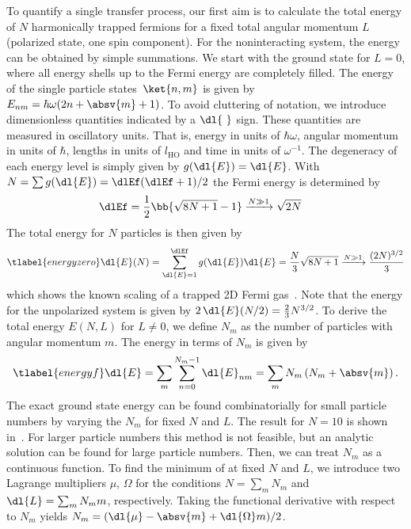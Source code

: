 To quantify a single transfer process, our first aim is to calculate the total energy of $N$ harmonically trapped fermions for a fixed total angular momentum $L$ (polarized state, one spin component). For the noninteracting system, the energy can be obtained by simple summations. We start with the ground state for $L=0$, where all energy shells up to the Fermi energy are completely filled. The energy of the single particle states~$\ket{n,m}$ is given by $E_{nm}=\hbar\omega(2n+\absv{m}+1)$. To avoid cluttering of notation, we introduce dimensionless quantities indicated by a $\dl{\ }$ sign. These quantities are measured in oscillatory units. That is, energy in units of $\hbar\omega$, angular momentum in units of $\hbar$, lengths in units of $l_\text{HO}$ and time in units of $\omega^{-1}$. The degeneracy of each energy level is simply given by $g(\dl{E}) = \dl{E}$.
With $N=\sum g(\dl{E}) = \dlEf(\dlEf+1)/2$ the Fermi energy is determined by
\begin{align}
\dlEf &= \frac{1}{2}\bb{\sqrt{8N+1}-1} \xrightarrow{N\gg 1} \sqrt{2N}
\end{align}
The total energy for $N$ particles is then given by
\begin{align} \tlabel{energyzero}
\dl{E}(N) = \sum_{\dl{E}=1}^{\dlEf} g(\dl{E}) \dl{E} = \frac{N}{3} \sqrt{8N+1} \xrightarrow{N\gg 1} \frac{(2N)^{3/2}}{3}
\end{align}
which shows the known scaling of a trapped 2D Fermi gas~\cite{Yoshimoto2003}.
Note that the energy for the unpolarized system is given by $2\,\dl{E}(N/2)=\frac{2}{3} N^{3/2}$.
To derive the total energy $E(N,L)$ for $L\ne 0$, we define $N_m$ as the number of particles with angular momentum $m$. The energy in terms of $N_m$ is given by
\begin{align} \tlabel{energyf}
\dl{E} = \sum_m \sum_{n=0}^{N_m-1} \dl{E}_{nm} = \sum_m N_m\left(N_m + \absv{m} \right).
\end{align}
The exact ground state energy can be found combinatorially for small particle numbers by varying the $N_m$ for fixed $N$ and $L$. The result for $N=10$ is shown in~. For larger particle numbers this method is not feasible, but an analytic solution can be found for large particle numbers. Then, we can treat $N_{m}$ as a continuous function. To find the minimum of  at fixed $N$ and $L$, we introduce two Lagrange multipliers $\mu$, $\Omega$ for the conditions $N = \sum_m N_m$ and $\dl{L} = \sum_m N_m m$, respectively. Taking the functional derivative with respect to $N_m$ yields
$N_m=(\dl{\mu}-\absv{m}+\dl{\Omega} m)/2$.
